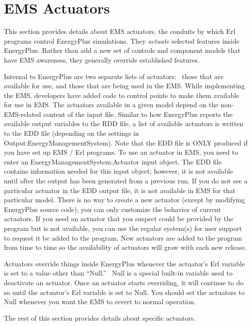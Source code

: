 \chapter{EMS Actuators}\label{ems-actuators}

This section provides details about EMS actuators, the conduits by which Erl programs control EnergyPlus simulations. They \emph{actuate} selected features inside EnergyPlus. Rather than add a new set of controls and component models that have EMS awareness, they generally override established features.

Internal to EnergyPlus are two separate lists of actuators:~ those that are available for use, and those that are being used in the EMS. While implementing the EMS, developers have added code to control points to make them available for use in EMS. The actuators available in a given model depend on the non-EMS-related content of the input file. Similar to how EnergyPlus reports the available output variables to the RDD file, a list of available actuators is written to the EDD file (depending on the settings in Output:EnergyManagementSystem). Note that the EDD file is ONLY produced if you have set up EMS / Erl programs. To use an actuator in EMS, you need to enter an EnergyManagementSystem:Actuator input object. The EDD file contains information needed for this input object; however, it is not available until after the output has been generated from a previous run. If you do not see a particular actuator in the EDD output file, it is not available in EMS for that particular model. There is no way to create a new actuator (except by modifying EnergyPlus source code); you can only customize the behavior of current actuators. If you need an actuator that you suspect could be provided by the program but is not available, you can use the regular system(s) for user support to request it be added to the program. New actuators are added to the program from time to time so the availability of actuators will grow with each new release.

Actuators override things inside EnergyPlus whenever the actuator's Erl variable is set to a value other than ``Null.''~ Null is a special built-in variable used to deactivate an actuator. Once an actuator starts overriding, it will continue to do so until the actuator's Erl variable is set to Null. You should set the actuators to Null whenever you want the EMS to revert to normal operation.

The rest of this section provides details about specific actuators.
